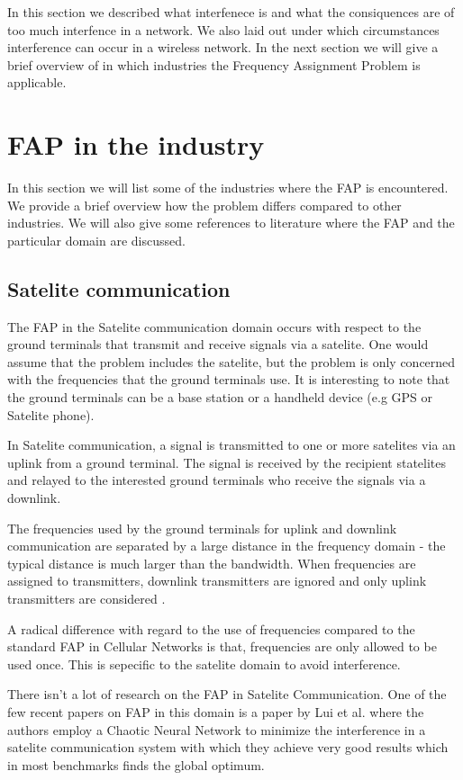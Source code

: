 In this section we described what interfenece is and what the consiquences are of too much interfence in a network. We also laid out under which circumstances interference can occur in a wireless network. In the next section we will give a brief overview of in which industries the Frequency Assignment Problem is applicable.
\section{FAP in the industry}
\label{sec:FAPIndustry}
In this section we will list some of the industries where the FAP is encountered. We provide a brief overview how the problem differs compared to other industries. We will also give some references to literature where the FAP and the particular domain are discussed. 

\subsection{Satelite communication}
The FAP in the Satelite communication domain occurs with respect to the ground terminals that transmit and receive signals via a satelite. One would assume that the problem includes the satelite, but the problem is only concerned with the frequencies that the ground terminals use. It is interesting to note that the ground terminals can be a base station or a handheld device (e.g GPS or Satelite phone).

In Satelite communication, a signal is transmitted to one or more satelites via an uplink from a ground terminal. The signal is received by the recipient statelites and relayed to the interested ground terminals who receive the signals via a downlink.

The frequencies used by the ground terminals for uplink and downlink communication are separated by a large distance in the frequency domain - the typical distance is much larger than the bandwidth. When frequencies are assigned to transmitters, downlink transmitters are ignored and only uplink transmitters are considered \cite{Karen2004}. 

A radical difference with regard to the use of frequencies compared to the standard FAP in Cellular Networks is that, frequencies are only allowed to be used once. This is sepecific to the satelite domain to avoid interference\cite{Karen2004}.

There isn't a lot of research on the FAP in Satelite Communication. One of the few recent papers on FAP in this domain is a paper by Lui et al.\cite{MISatelite} where the authors employ a Chaotic Neural Network to minimize the interference in a satelite communication system with which they achieve very good results which in most benchmarks finds the global optimum.

